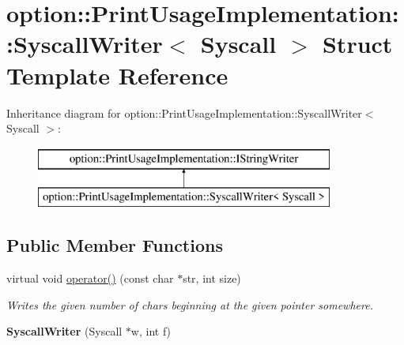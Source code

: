 \hypertarget{structoption_1_1PrintUsageImplementation_1_1SyscallWriter}{}\section{option\+:\+:Print\+Usage\+Implementation\+:\+:Syscall\+Writer$<$ Syscall $>$ Struct Template Reference}
\label{structoption_1_1PrintUsageImplementation_1_1SyscallWriter}
Inheritance diagram for option\+:\+:Print\+Usage\+Implementation\+:\+:Syscall\+Writer$<$ Syscall $>$\+:\begin{figure}[H]
\begin{center}
\leavevmode
\includegraphics[height=2.000000cm]{structoption_1_1PrintUsageImplementation_1_1SyscallWriter}
\end{center}
\end{figure}
\subsection*{Public Member Functions}
\begin{DoxyCompactItemize}
\item 
\mbox{\label{structoption_1_1PrintUsageImplementation_1_1SyscallWriter_a61c1c010d9b67affd5f1208f0a3e9cf0}} 
virtual void \hyperlink{structoption_1_1PrintUsageImplementation_1_1SyscallWriter_a61c1c010d9b67affd5f1208f0a3e9cf0}{operator()} (const char $\ast$str, int size)
\begin{DoxyCompactList}\small\item\em Writes the given number of chars beginning at the given pointer somewhere. \end{DoxyCompactList}\item 
\mbox{\label{structoption_1_1PrintUsageImplementation_1_1SyscallWriter_ae4f8677dbd79b0a9238368e28014701a}} 
{\bfseries Syscall\+Writer} (Syscall $\ast$w, int f)
\end{DoxyCompactItemize}
